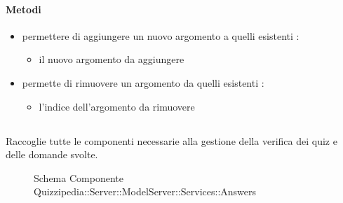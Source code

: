 \paragraph{Metodi}
\begin{itemize}
\item {}
\newline
permettere di aggiungere un nuovo argomento a quelli esistenti
\newline
{} :
\begin{itemize}
\item {}
\newline
il nuovo argomento da aggiungere
\end{itemize}
\item {}
\newline
permette di rimuovere un argomento da quelli esistenti
\newline
{} :
\begin{itemize}
\item {}
\newline
l'indice dell'argomento da rimuovere
\end{itemize}
\end{itemize}
\subsection{}
Raccoglie tutte le componenti necessarie alla gestione della verifica dei quiz e delle domande svolte.
\begin{figure}[H]
\centering
\noindent{}
\caption[Schema Componente Quizzipedia::Server::ModelServer::Services::Answers]{Schema Componente Quizzipedia::Server::ModelServer::Services::Answers}
\end{figure}
